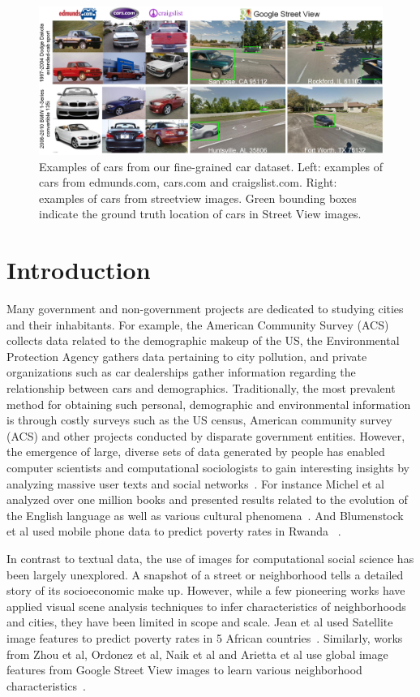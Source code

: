 \documentclass[letterpaper]{article}
\begin{document}
\begin{figure}[t]
\begin{center}
\includegraphics[width=1\linewidth]{img/dataset_figure.png}
\end{center}
\caption{ Examples of cars from our fine-grained car dataset. Left: examples of cars from edmunds.com, cars.com and craigslist.com. Right: examples of cars from streetview images. Green bounding boxes indicate the ground truth location of cars in Street View images.}
\label{fig:dataset1}
\end{figure}
\section{Introduction}

Many government and non-government projects are dedicated to studying cities and their inhabitants. For example, the American Community Survey (ACS) collects data related to the demographic makeup of the US, the Environmental Protection Agency gathers data pertaining to city pollution, and private organizations such as car dealerships gather information regarding the relationship between cars and demographics. Traditionally, the most prevalent method for obtaining such personal, demographic and environmental information is through costly surveys such as the US census, American community survey (ACS) and other projects conducted by disparate government entities. However, the emergence of large, diverse sets of data generated by people has enabled computer scientists and computational sociologists to gain interesting insights by analyzing massive user texts and social networks~\cite{jure,nlp_people}. For instance Michel et al analyzed over one million books and presented results related to the evolution of the English language as well as various cultural phenomena~\cite{ngrams}.  And  Blumenstock et al used mobile phone data to predict poverty rates in Rwanda ~\cite{mobile}.

In contrast to textual data, the use of images for computational social science has been largely unexplored. A snapshot of a street or neighborhood tells a detailed story of its socioeconomic make up. However, while a few pioneering works have applied visual scene analysis techniques to infer characteristics of neighborhoods and cities, they have been limited in scope and scale. Jean et al used Satellite image features to predict poverty rates in 5 African countries~\cite{neal}. Similarly, works from Zhou et al, Ordonez et al, Naik et al and Arietta et al use global image features from Google Street View images to learn various neighborhood characteristics~\cite{antonio,tamara,mit_cvpr,alyosha}.
\end{document}
